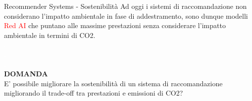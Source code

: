 \begin{frame}{Recommender Systems -  Sostenibilità}
    Ad oggi i sistemi di raccomandazione non considerano l'impatto ambientale in fase di addestramento, sono dunque modelli \textcolor{red}{Red AI} che puntano alle massime prestazioni senza considerare l'impatto ambientale in termini di CO2.\\
    \textcolor{white}{\textbf{.}}\\
\textcolor{white}{\textbf{.}}\\
\textcolor{white}{\textbf{.}}\\
    \textbf{DOMANDA}\\
    E' possibile migliorare la sostenibilità di un sistema di raccomandazione migliorando il trade-off tra prestazioni e emissioni di CO2?
\end{frame}
